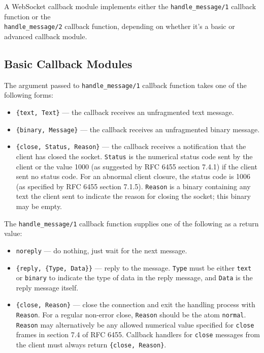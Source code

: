 \documentclass[11pt,oneside,english]{book}
\begin{document}
A WebSocket callback module implements either the
\verb+handle_message/1+ callback function or the
\\ \verb+handle_message/2+ callback function, depending on whether
it's a basic or advanced callback module.

\subsection{Basic Callback Modules}

The argument passed to \verb+handle_message/1+ callback function takes
one of the following forms:

\begin{itemize}

\item \verb+{text, Text}+ --- the callback receives an unfragmented
  text message.

\item \verb+{binary, Message}+ --- the callback receives an
  unfragmented binary message.

\item \verb+{close, Status, Reason}+ --- the callback receives a
  notification that the client has closed the socket. \verb+Status+ is the
  numerical status code sent by the client or the value 1000 (as suggested
  by RFC 6455 section 7.4.1) if the client sent no status code. For an
  abnormal client closure, the status code is 1006 (as specified by RFC
  6455 section 7.1.5). \verb+Reason+ is a binary containing any text the
  client sent to indicate the reason for closing the socket; this binary
  may be empty.

\end{itemize}

The \verb+handle_message/1+ callback function supplies one of the
following as a return value:

\begin{itemize}

\item \verb+noreply+ --- do nothing, just wait for the next message.

\item \verb+{reply, {Type, Data}}+ --- reply to the
  message. \verb+Type+ must be either \verb+text+ or \verb+binary+ to
  indicate the type of data in the reply message, and \verb+Data+ is
  the reply message itself.

\item \verb+{close, Reason}+ --- close the connection and exit the
  handling process with \verb+Reason+. For a regular non-error close,
  \verb+Reason+ should be the atom \verb+normal+. \verb+Reason+ may
  alternatively be any allowed numerical value specified for
  \verb+close+ frames in section 7.4 of RFC 6455. Callback handlers
  for \verb+close+ messages from the client must always return
  \verb+{close, Reason}+.

\end{itemize}
\end{document}
